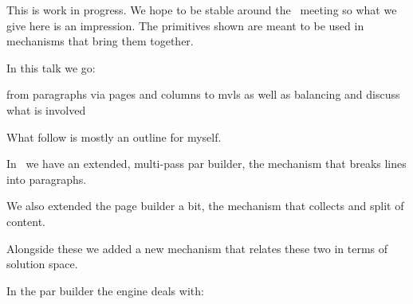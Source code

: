 



\setupbackgrounds
  [text]
  [background=extratext]

\setuptyping
  [align=hangright,
   keeptogether=paragraph,
   numbering=]

\startdocument
  [title={balancing mvls},
   banner={from one to the other},
   location={bachotex\enspace {\bf 2025}\enspace meeting}]

\starttitle[title=Disclaimer]

This is work in progress. We hope to be stable around the \CONTEXT\ meeting so
what we give here is an impression. The primitives shown are meant to be used in
mechanisms that bring them together.

In this talk we go:

\startitemize[packed]
\startitem from paragraphs \stopitem
\startitem via pages \stopitem
\startitem and columns \stopitem
\startitem to mvls \stopitem
\startitem as well as balancing \stopitem
\startitem and discuss what is involved \stopitem
\stopitemize

What follow is mostly an outline for myself.

\stoptitle

\starttitle[title=The context]

\startitemize

\startitem
    In \LUAMETATEX\ we have an extended, multi-pass par builder, the mechanism
    that breaks lines into paragraphs.
\stopitem

\startitem
    We also extended the page builder a bit, the mechanism that collects and
    split of content.
\stopitem

\startitem
    Alongside these we added a new mechanism that relates these two in terms of
    solution space.
\stopitem

\stopitemize

\stoptitle

\starttitle[title={Paragraphs}]

In the par builder the engine deals with:

